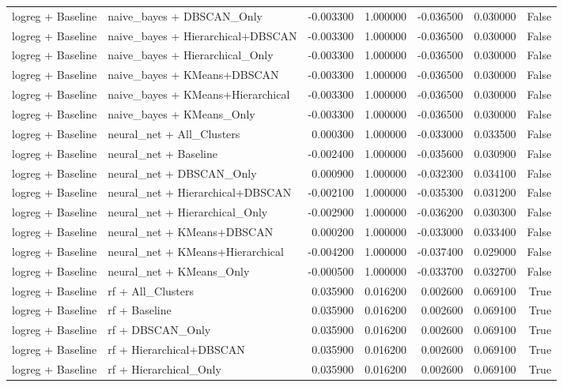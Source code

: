 \begin{tabular}{llrrrrr}
logreg + Baseline & naive_bayes + DBSCAN_Only & -0.003300 & 1.000000 & -0.036500 & 0.030000 & False \\
logreg + Baseline & naive_bayes + Hierarchical+DBSCAN & -0.003300 & 1.000000 & -0.036500 & 0.030000 & False \\
logreg + Baseline & naive_bayes + Hierarchical_Only & -0.003300 & 1.000000 & -0.036500 & 0.030000 & False \\
logreg + Baseline & naive_bayes + KMeans+DBSCAN & -0.003300 & 1.000000 & -0.036500 & 0.030000 & False \\
logreg + Baseline & naive_bayes + KMeans+Hierarchical & -0.003300 & 1.000000 & -0.036500 & 0.030000 & False \\
logreg + Baseline & naive_bayes + KMeans_Only & -0.003300 & 1.000000 & -0.036500 & 0.030000 & False \\
logreg + Baseline & neural_net + All_Clusters & 0.000300 & 1.000000 & -0.033000 & 0.033500 & False \\
logreg + Baseline & neural_net + Baseline & -0.002400 & 1.000000 & -0.035600 & 0.030900 & False \\
logreg + Baseline & neural_net + DBSCAN_Only & 0.000900 & 1.000000 & -0.032300 & 0.034100 & False \\
logreg + Baseline & neural_net + Hierarchical+DBSCAN & -0.002100 & 1.000000 & -0.035300 & 0.031200 & False \\
logreg + Baseline & neural_net + Hierarchical_Only & -0.002900 & 1.000000 & -0.036200 & 0.030300 & False \\
logreg + Baseline & neural_net + KMeans+DBSCAN & 0.000200 & 1.000000 & -0.033000 & 0.033400 & False \\
logreg + Baseline & neural_net + KMeans+Hierarchical & -0.004200 & 1.000000 & -0.037400 & 0.029000 & False \\
logreg + Baseline & neural_net + KMeans_Only & -0.000500 & 1.000000 & -0.033700 & 0.032700 & False \\
logreg + Baseline & rf + All_Clusters & 0.035900 & 0.016200 & 0.002600 & 0.069100 & True \\
logreg + Baseline & rf + Baseline & 0.035900 & 0.016200 & 0.002600 & 0.069100 & True \\
logreg + Baseline & rf + DBSCAN_Only & 0.035900 & 0.016200 & 0.002600 & 0.069100 & True \\
logreg + Baseline & rf + Hierarchical+DBSCAN & 0.035900 & 0.016200 & 0.002600 & 0.069100 & True \\
logreg + Baseline & rf + Hierarchical_Only & 0.035900 & 0.016200 & 0.002600 & 0.069100 & True \\

\end{tabular}
